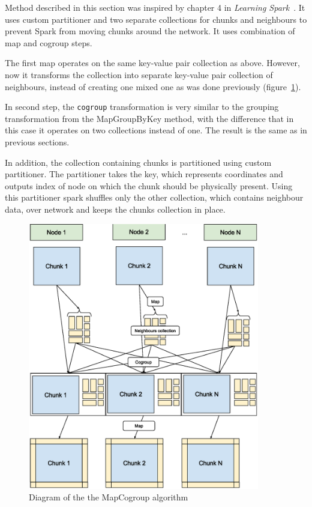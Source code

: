 \documentclass{l4proj}
\begin{document}
Method described in this section was inspired by chapter 4 in \textit{Learning Spark}~\cite{learning_spark}.
It uses custom partitioner and two separate collections for chunks and neighbours
to prevent Spark from moving chunks around the network. It uses combination
of map and cogroup steps.

The first map operates on the same key-value pair collection as above. However,
now it transforms the collection into separate key-value pair collection of neighbours,
instead of creating one mixed one as was done previously (figure~\ref{fig:map_cogroup}).

In second step, the \texttt{cogroup} transformation is very similar to the grouping transformation
from the MapGroupByKey method, with the difference that in this case it operates on two collections 
instead of one. The result is the same as in previous sections.

In addition, the collection containing chunks is partitioned using custom partitioner.
The partitioner takes the key, which represents coordinates and outputs index of node
on which the chunk should be physically present. Using this partitioner spark
shuffles only the other collection, which contains neighbour data, over network and
keeps the chunks collection in place.

\begin{figure}
\centering
\includegraphics[width=0.9\textwidth]{images/MapCogroup.eps}
\caption{Diagram of the the MapCogroup algorithm}
\label{fig:map_cogroup}
\end{figure}
\end{document}
